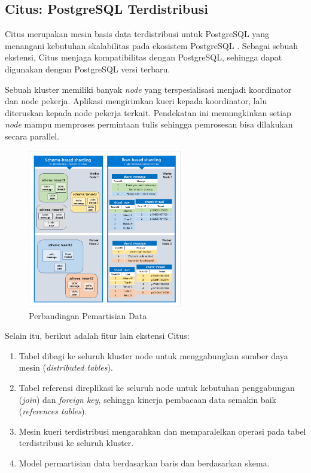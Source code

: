 \subsection{Citus: PostgreSQL Terdistribusi}

Citus merupakan mesin basis data terdistribusi untuk PostgreSQL yang menangani kebutuhan skalabilitas pada ekosistem PostgreSQL \parencite{citus}. Sebagai sebuah ekstensi, Citus menjaga kompatibilitas dengan PostgreSQL, sehingga dapat digunakan dengan PostgreSQL versi terbaru.

Sebuah kluster memiliki banyak \textit{node} yang terspesialisasi menjadi koordinator dan node pekerja. Aplikasi mengirimkan kueri kepada koordinator, lalu diteruskan kepada node pekerja terkait. Pendekatan ini memungkinkan setiap \textit{node} mampu memproses permintaan tulis sehingga pemrosesan bisa dilakukan secara parallel.

\pagebreak

\begin{figure}[htbp]
    \centering
    \includegraphics[width=0.6\textwidth]{resources/chapter-2/row-vs-schema-sharding.png}
    \caption{Perbandingan Pemartisian Data \parencite{schemaBasedSharding}}
    \label{fig:row-vs-schema-sharding}
\end{figure}

Selain itu, berikut adalah fitur lain ekstensi Citus:

\begin{enumerate}
    \item Tabel dibagi ke seluruh kluster node untuk menggabungkan sumber daya mesin (\textit{distributed tables}).
    \item Tabel referensi direplikasi ke seluruh node untuk kebutuhan penggabungan (\textit{join}) dan \textit{foreign key}, sehingga kinerja pembacaan data semakin baik (\textit{references tables}).
    \item Mesin kueri terdistribusi mengarahkan dan memparalelkan operasi pada tabel terdistribusi ke seluruh kluster.
    \item Model permartisian data berdasarkan baris dan berdasarkan skema.
\end{enumerate}
